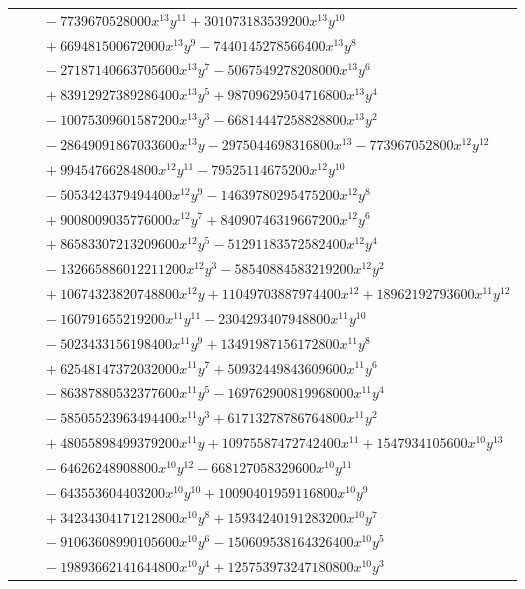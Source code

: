\documentclass[11pt]{article}
\begin{document}
\begin{longtable}{@{}ll@{}}
 & $\quad -7739670528000x^{13}y^{11}+301073183539200x^{13}y^{10}$\\
 & $\quad +669481500672000x^{13}y^{9}-7440145278566400x^{13}y^{8}$\\
 & $\quad -27187140663705600x^{13}y^{7}-5067549278208000x^{13}y^{6}$\\
 & $\quad +83912927389286400x^{13}y^{5}+98709629504716800x^{13}y^{4}$\\
 & $\quad -10075309601587200x^{13}y^{3}-66814447258828800x^{13}y^{2}$\\
 & $\quad -28649091867033600x^{13}y-2975044698316800x^{13}-773967052800x^{12}y^{12}$\\
 & $\quad +99454766284800x^{12}y^{11}-79525114675200x^{12}y^{10}$\\
 & $\quad -5053424379494400x^{12}y^{9}-14639780295475200x^{12}y^{8}$\\
 & $\quad +9008009035776000x^{12}y^{7}+84090746319667200x^{12}y^{6}$\\
 & $\quad +86583307213209600x^{12}y^{5}-51291183572582400x^{12}y^{4}$\\
 & $\quad -132665886012211200x^{12}y^{3}-58540884583219200x^{12}y^{2}$\\
 & $\quad +10674323820748800x^{12}y+11049703887974400x^{12}+18962192793600x^{11}y^{12}$\\
 & $\quad -160791655219200x^{11}y^{11}-2304293407948800x^{11}y^{10}$\\
 & $\quad -5023433156198400x^{11}y^{9}+13491987156172800x^{11}y^{8}$\\
 & $\quad +62548147372032000x^{11}y^{7}+50932449843609600x^{11}y^{6}$\\
 & $\quad -86387880532377600x^{11}y^{5}-169762900819968000x^{11}y^{4}$\\
 & $\quad -58505523963494400x^{11}y^{3}+61713278786764800x^{11}y^{2}$\\
 & $\quad +48055898499379200x^{11}y+10975587472742400x^{11}+1547934105600x^{10}y^{13}$\\
 & $\quad -64626248908800x^{10}y^{12}-668127058329600x^{10}y^{11}$\\
 & $\quad -643553604403200x^{10}y^{10}+10090401959116800x^{10}y^{9}$\\
 & $\quad +34234304171212800x^{10}y^{8}+15934240191283200x^{10}y^{7}$\\
 & $\quad -91063608990105600x^{10}y^{6}-150609538164326400x^{10}y^{5}$\\
 & $\quad -19893662141644800x^{10}y^{4}+125753973247180800x^{10}y^{3}$\\

\end{longtable}
\end{document}

